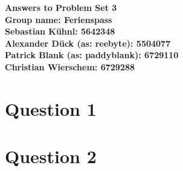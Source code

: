 \documentclass{article}
\begin{document}
\begin{center}
\LARGE \bfseries{Answers to Problem Set 3}\\
 Group name: Ferienspass\vspace{.5cm}\\
 \normalsize \normalfont
  Sebastian K\"uhnl: 5642348\\
  Alexander D\"uck (as: reebyte): 5504077\\
  Patrick Blank (as: paddyblank): 6729110\\
  Christian Wierschem: 6729288
\end{center}
\normalsize	

\section{Question 1}
\section{Question 2}
\end{document}
